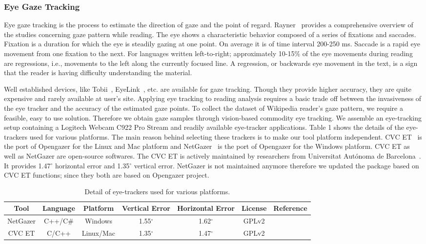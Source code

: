 \documentclass[12pt]{article}
\begin{document}
\subsubsection{Eye Gaze Tracking}
Eye gaze tracking is the process to estimate the direction of gaze and the point of regard. Rayner~\cite{rayner1998eye} provides a comprehensive overview of the studies concerning gaze pattern while reading. The eye shows a characteristic behavior composed of a series of fixations and saccades. Fixation is a duration for which the eye is steadily gazing at one point. On average it is of time interval 200-250 ms. Saccade is a rapid eye movement from one fixation to the next. For languages written left-to-right; approximately 10-15\% of the eye movements during reading are regressions, i.e., movements to the left along the currently focused line. A regression, or backwards eye movement in the text, is a sign that the
reader is having difficulty understanding the material.

Well established devices, like Tobii~\cite{olsen2012tobii}, EyeLink~\cite{cornelissen2002eyelink}, etc. are available for gaze tracking. Though they provide higher accuracy, they are quite expensive and rarely available at user's site. Applying eye tracking to reading analysis requires a basic trade off between the invasiveness of the eye tracker and the accuracy of the estimated gaze points. To collect the dataset of Wikipedia reader's gaze pattern, we require a feasible, easy to use solution. 
Therefore we obtain gaze samples through vision-based commodity eye tracking. We assemble an eye-tracking setup containing a Logitech Webcam C922 Pro Stream and readily available eye-tracker applications. Table 1 shows the details of the eye-trackers used for various platforms. 
The main reason behind selecting these trackers is to make our tool platform independent. CVC ET~\cite{ferhat2014cheap, CVC} is the port of Opengazer for the Linux and Mac platform and NetGazer~\cite{WinNT} is the port of Opengazer for the Windows platform. CVC ET as well as NetGazer are open-source softwares. The CVC ET is actively maintained by researchers from Universitat Aut\'{o}noma de Barcelona~\cite{CVC}. It provides 1.47$^{\circ}$ horizontal error and 1.35$^{\circ}$ vertical error. NetGazer is not maintained anymore therefore we updated the package based on CVC ET functions; since they both are based on Opengazer project. 

\begin{table}[]
\begin{tabular}{|c|c|c|c|c|c|c|}
\hline
Tool     & Language & Platform  & Vertical Error & Horizontal Error & License & Reference                     \\ \hline
NetGazer & C++/C\#  & Windows   & 1.55$^{\circ}$ & 1.62$^{\circ}$   & GPLv2   & \cite{WinNT} \\ \hline
CVC ET   & C/C++    & Linux/Mac & 1.35$^{\circ}$ & 1.47$^{\circ}$   & GPLv2   & \cite{CVC}   \\ \hline
\end{tabular}
\caption{Detail of eye-trackers used for various platforms.}
\label{tab:eye_tracker}
\end{table}
\end{document}
